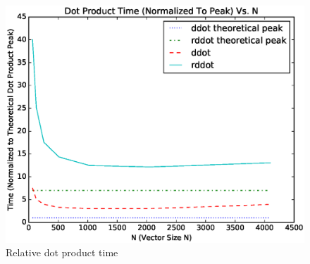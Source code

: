   \begin{figure}[H]
  \begin{center}
  \includegraphics[width=\textwidth]{plots/dot_comparison}
  \caption{Relative dot product time}
  \label{fig:dot_timings}
  \end{center}
  \end{figure}
